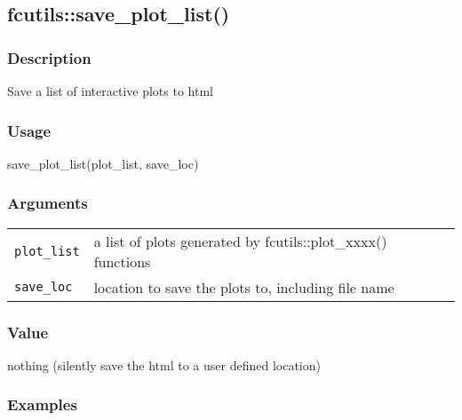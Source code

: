 \documentclass[
  letterpaper,
  DIV=11,
  numbers=noendperiod]{scrreport}
\newenvironment{Shaded}{\begin{snugshade}}{\end{snugshade}}
\newcommand{\FunctionTok}[1]{\textcolor[rgb]{0.28,0.35,0.67}{#1}}
\newcommand{\NormalTok}[1]{\textcolor[rgb]{0.00,0.23,0.31}{#1}}
\begin{document}
\subsection{fcutils::save\_plot\_list()}\label{fcutilssave_plot_list}

\subsubsection{Description}\label{description-68}

Save a list of interactive plots to html

\subsubsection{Usage}\label{usage-68}

\begin{Shaded}
\begin{Highlighting}[]
\FunctionTok{save\_plot\_list}\NormalTok{(plot\_list, save\_loc)}
\end{Highlighting}
\end{Shaded}

\subsubsection{Arguments}\label{arguments-68}

\begin{longtable}[]{@{}ll@{}}
\toprule\noalign{}
\endhead
\bottomrule\noalign{}
\endlastfoot
\texttt{plot\_list} & a list of plots generated by fcutils::plot\_xxxx()
functions \\
\texttt{save\_loc} & location to save the plots to, including file
name \\
\end{longtable}

\subsubsection{Value}\label{value-66}

nothing (silently save the html to a user defined location)

\subsubsection{Examples}\label{examples-68}
\end{document}
